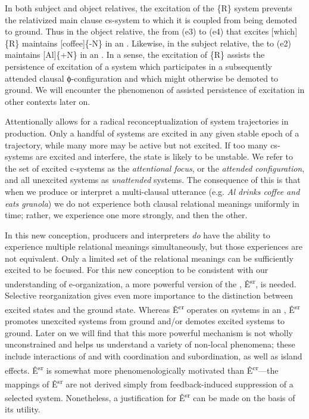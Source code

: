   In both subject and object relatives, the excitation of the \{R\} system prevents the relativized main clause cs-system to which it is coupled from being demoted to ground. Thus in the object relative, the  from (e3) to (e4) that excites [which]\{R\} maintains [coffee]\{-N\} in an . Likewise, in the subject relative, the  to (e2) maintains [Al]\{+N\} in an . In a sense, the excitation of \{R\} assists the persistence of excitation of a system which participates in a subsequently attended clausal ϕ-configuration and which might otherwise be demoted to ground. We will encounter the phenomenon of assisted persistence of excitation in other contexts later on.

Attentionally  allows for a radical reconceptualization of system trajectories in production.  Only a handful of systems are excited in any given stable epoch of a trajectory, while many more may be active but not excited. If too many cs-systems are excited and interfere, the state is likely to be unstable. We refer to the set of excited c-systems as the \textit{attentional focus}, or the \textit{attended configuration}, and all unexcited systems as \textit{unattended} systems. The consequence of this is that when we produce or interpret a multi-clausal utterance (e.g. \textit{Al drinks coffee and eats granola}) we do not experience both clausal relational meanings uniformly in time; rather, we experience one  more strongly, and then the other.

  In this new conception, producers and interpreters \textit{do} have the ability to experience multiple relational meanings simultaneously, but those experiences are not equivalent. Only a limited set of the relational meanings can be sufficiently excited to be  focused. For this new conception to be consistent with our understanding of e-organization, a more powerful version of the , Ê\textsuperscript{sr},  is needed. Selective reorganization gives even more importance to the distinction between excited states and the ground state. Whereas Ê\textsuperscript{cr} operates on systems in an , Ê\textsuperscript{sr} promotes unexcited systems from ground and/or demotes excited systems to ground. Later on we will find that this more powerful mechanism is not wholly unconstrained and helps us understand a variety of non-local phenomena; these include interactions of  and  with coordination and subordination, as well as island effects. Ê\textsuperscript{sr} is somewhat more phenomenologically motivated than Ê\textsuperscript{cr}—the mappings of Ê\textsuperscript{sr} are not derived simply from feedback-induced suppression of a selected system. Nonetheless, a justification for Ê\textsuperscript{sr} can be made on the basis of its utility.

